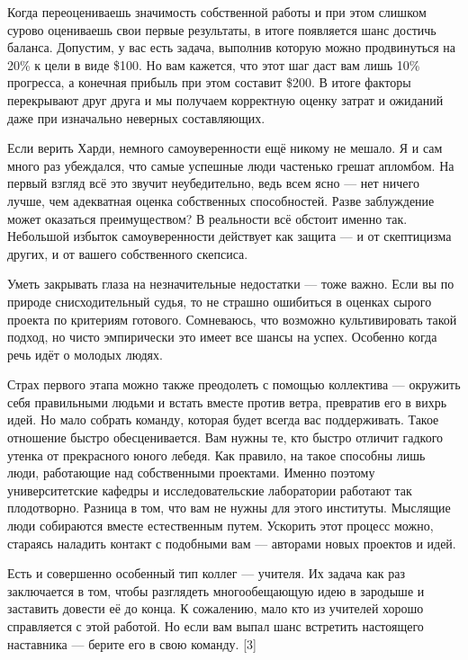 \documentclass[ebook,12pt,oneside,openany]{memoir}
\begin{document}
Когда переоцениваешь значимость собственной работы и при этом слишком
сурово оцениваешь свои первые результаты, в итоге появляется шанс
достичь баланса. Допустим, у вас есть задача, выполнив которую можно
продвинуться на 20\% к цели в виде \$100. Но вам кажется, что этот шаг
даст вам лишь 10\% прогресса, а конечная прибыль при этом составит
\$200. В итоге факторы перекрывают друг друга и мы получаем корректную
оценку затрат и ожиданий даже при изначально неверных составляющих. \newline

Если верить Харди, немного самоуверенности ещё никому не мешало. Я и
сам много раз убеждался, что самые успешные люди частенько грешат
апломбом. На первый взгляд всё это звучит неубедительно, ведь всем
ясно — нет ничего лучше, чем адекватная оценка собственных
способностей. Разве заблуждение может оказаться преимуществом? В
реальности всё обстоит именно так. Небольшой избыток самоуверенности
действует как защита — и от скептицизма других, и от вашего
собственного скепсиса. \newline

Уметь закрывать глаза на незначительные недостатки — тоже важно. Если
вы по природе снисходительный судья, то не страшно ошибиться в оценках
сырого проекта по критериям готового. Сомневаюсь, что возможно
культивировать такой подход, но чисто эмпирически это имеет все шансы
на успех. Особенно когда речь идёт о молодых людях. \newline

Страх первого этапа можно также преодолеть с помощью коллектива —
окружить себя правильными людьми и встать вместе против ветра,
превратив его в вихрь идей. Но мало собрать команду, которая будет
всегда вас поддерживать. Такое отношение быстро обесценивается. Вам
нужны те, кто быстро отличит гадкого утенка от прекрасного юного
лебедя. Как правило, на такое способны лишь люди, работающие над
собственными проектами. Именно поэтому университетские кафедры и
исследовательские лаборатории работают так плодотворно. Разница в том,
что вам не нужны для этого институты. Мыслящие люди собираются вместе
естественным путем. Ускорить этот процесс можно, стараясь наладить
контакт с подобными вам — авторами новых проектов и идей. \newline

Есть и совершенно особенный тип коллег — учителя. Их задача как раз
заключается в том, чтобы разглядеть многообещающую идею в зародыше и
заставить довести её до конца. К сожалению, мало кто из учителей
хорошо справляется с этой работой. Но если вам выпал шанс встретить
настоящего наставника — берите его в свою команду. [3] \newline
\end{document}
